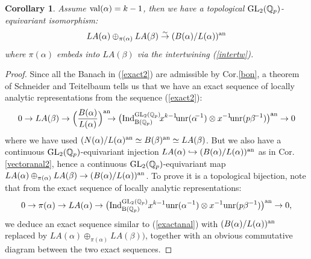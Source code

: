 \documentclass[11pt]{amsart}
\def\Q{{\mathbb Q}_p}
\def\G{{\rm GL}_2(\Q)}
\def\B{{\rm B}(\Q)}
\newtheorem{cor}[definit]{\bf{Corollary}}
\begin{document}
\begin{cor}\label{vectoranal} 
Assume ${\rm val}(\alpha)=k-1$, then we have a topological $\G$-equivariant isomorphism: 
$$LA(\alpha)\oplus_{\pi(\alpha)}LA(\beta)\buildrel\sim\over\rightarrow
(B(\alpha)/L(\alpha))^{\rm an}$$  
where $\pi(\alpha)$ embeds into $LA(\beta)$ via the intertwining (\ref{intertw}). 
\end{cor} 
\begin{proof} 
Since all the Banach in (\ref{exact2}) are admissible by
Cor.\ref{bon}, a theorem of Schneider and Teitelbaum tells us that we
have an exact sequence of locally analytic representations from the
sequence (\ref{exact2}):  
\begin{eqnarray}\label{exactanal} 
0\rightarrow LA(\beta)\rightarrow
\Big(\frac{B(\alpha)}{L(\alpha)}\Big)^{\rm an}\!\!\!\!\rightarrow
\big({\rm Ind}_{\B}^{\G}\!x^{k-1}\!{\rm unr}(\alpha^{\!\!-1})\otimes
x^{-1}\!{\rm unr}(p\beta^{\!-1})\big)^{\rm an}
\rightarrow 0 
\end{eqnarray} 
where we have used $(N(\alpha)/L(\alpha)^{\rm an}\simeq B(\beta)^{\rm
  an}\simeq LA(\beta)$. But we also have a continuous $\G$-equivariant
injection $LA(\alpha)\hookrightarrow (B(\alpha)/L(\alpha))^{\rm an}$
as in Cor.\ref{vectoranal2}, hence a continuous $\G$-equivariant map
$LA(\alpha)\oplus_{\pi(\alpha)}LA(\beta)\rightarrow
(B(\alpha)/L(\alpha))^{\rm an}$. To prove it is a topological
bijection, note that from the exact sequence of locally analytic
representations: 
\begin{eqnarray*} 
0\rightarrow \pi(\alpha)\rightarrow LA(\alpha)\rightarrow 
\big({\rm Ind}_{\B}^{\G}x^{k-1}{\rm unr}(\alpha^{-1})\otimes
x^{-1}{\rm unr}(p\beta^{-1})\big)^{\rm an}\rightarrow 0,  
\end{eqnarray*} 
we deduce an exact sequence similar to (\ref{exactanal}) with
$(B(\alpha)/L(\alpha))^{\rm an}$ replaced by
$LA(\alpha)\oplus_{\pi(\alpha)}LA(\beta))$, together with an obvious
commutative diagram between the two exact sequences.  
\end{proof} 
 
\end{document}
